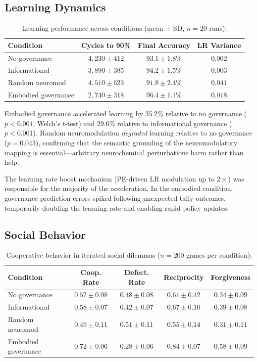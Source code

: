 \documentclass[11pt,a4paper]{article}
\begin{document}
\subsection{Learning Dynamics}

\begin{table}[h]
\centering
\caption{Learning performance across conditions (mean $\pm$ SD, $n = 20$ runs).}
\label{tab:learning}
\begin{tabular}{lccc}
\toprule
\textbf{Condition} & \textbf{Cycles to 90\%} & \textbf{Final Accuracy} & \textbf{LR Variance} \\
\midrule
No governance        & $4,230 \pm 412$ & $93.1 \pm 1.8\%$ & $0.002$ \\
Informational        & $3,890 \pm 385$ & $94.2 \pm 1.5\%$ & $0.003$ \\
Random neuromod      & $4,510 \pm 623$ & $91.8 \pm 2.4\%$ & $0.041$ \\
Embodied governance  & $2,740 \pm 318$ & $96.4 \pm 1.1\%$ & $0.018$ \\
\bottomrule
\end{tabular}
\end{table}

Embodied governance accelerated learning by 35.2\% relative to no governance ($p < 0.001$, Welch's $t$-test) and 29.6\% relative to informational governance ($p < 0.001$).
Random neuromodulation \emph{degraded} learning relative to no governance ($p = 0.043$), confirming that the semantic grounding of the neuromodulatory mapping is essential---arbitrary neurochemical perturbations harm rather than help.

The learning rate boost mechanism (PE-driven LR modulation up to $2\times$) was responsible for the majority of the acceleration.
In the embodied condition, governance prediction errors spiked following unexpected tally outcomes, temporarily doubling the learning rate and enabling rapid policy updates.

\subsection{Social Behavior}

\begin{table}[h]
\centering
\caption{Cooperative behavior in iterated social dilemmas ($n = 200$ games per condition).}
\label{tab:cooperation}
\begin{tabular}{lcccc}
\toprule
\textbf{Condition} & \textbf{Coop. Rate} & \textbf{Defect. Rate} & \textbf{Reciprocity} & \textbf{Forgiveness} \\
\midrule
No governance       & $0.52 \pm 0.08$ & $0.48 \pm 0.08$ & $0.61 \pm 0.12$ & $0.34 \pm 0.09$ \\
Informational       & $0.58 \pm 0.07$ & $0.42 \pm 0.07$ & $0.67 \pm 0.10$ & $0.39 \pm 0.08$ \\
Random neuromod     & $0.49 \pm 0.11$ & $0.51 \pm 0.11$ & $0.55 \pm 0.14$ & $0.31 \pm 0.11$ \\
Embodied governance & $0.72 \pm 0.06$ & $0.28 \pm 0.06$ & $0.84 \pm 0.07$ & $0.58 \pm 0.09$ \\
\bottomrule
\end{tabular}
\end{table}
\end{document}
